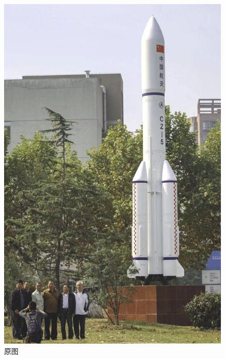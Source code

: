 \documentclass[12pt,a4paper]{article}
\begin{document}
\begin{CJK}{UTF8}{gbsn}
\begin{sloppypar}
\begin{figure}[H]
	\centering
	\begin{minipage}{0.3\linewidth}
		\centering
		\includegraphics[width=0.9\linewidth]{P2.jpg}
		\caption{原图}
		\label{f1}%
	\end{minipage}
	\begin{minipage}{0.3\linewidth}
		\centering

\end{minipage}
\end{figure}
\end{sloppypar}
\end{CJK}
\end{document}
